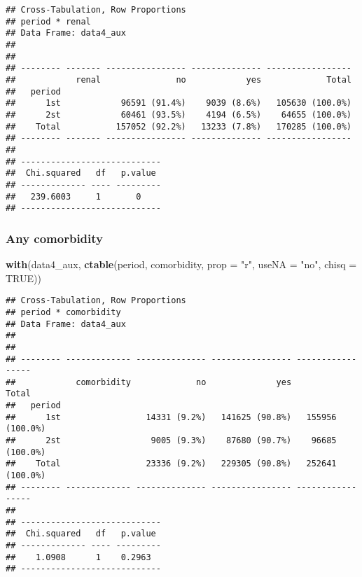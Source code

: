 \documentclass[
]{article}
\newenvironment{Shaded}{\begin{snugshade}}{\end{snugshade}}
\newcommand{\DataTypeTok}[1]{\textcolor[rgb]{0.13,0.29,0.53}{#1}}
\newcommand{\KeywordTok}[1]{\textcolor[rgb]{0.13,0.29,0.53}{\textbf{#1}}}
\newcommand{\NormalTok}[1]{#1}
\newcommand{\OtherTok}[1]{\textcolor[rgb]{0.56,0.35,0.01}{#1}}
\newcommand{\StringTok}[1]{\textcolor[rgb]{0.31,0.60,0.02}{#1}}
\begin{document}
\begin{verbatim}
## Cross-Tabulation, Row Proportions  
## period * renal  
## Data Frame: data4_aux  
## 
## 
## -------- ------- ---------------- -------------- -----------------
##            renal               no            yes             Total
##   period                                                          
##      1st            96591 (91.4%)    9039 (8.6%)   105630 (100.0%)
##      2st            60461 (93.5%)    4194 (6.5%)    64655 (100.0%)
##    Total           157052 (92.2%)   13233 (7.8%)   170285 (100.0%)
## -------- ------- ---------------- -------------- -----------------
## 
## ----------------------------
##  Chi.squared   df   p.value 
## ------------- ---- ---------
##   239.6003     1       0    
## ----------------------------
\end{verbatim}

\hypertarget{any-comorbidity}{%
\subsubsection{Any comorbidity}\label{any-comorbidity}}

\begin{Shaded}
\begin{Highlighting}[]
\KeywordTok{with}\NormalTok{(data4_aux, }\KeywordTok{ctable}\NormalTok{(period, comorbidity, }\DataTypeTok{prop =} \StringTok{"r"}\NormalTok{, }\DataTypeTok{useNA =} \StringTok{"no"}\NormalTok{, }\DataTypeTok{chisq =} \OtherTok{TRUE}\NormalTok{))}
\end{Highlighting}
\end{Shaded}

\begin{verbatim}
## Cross-Tabulation, Row Proportions  
## period * comorbidity  
## Data Frame: data4_aux  
## 
## 
## -------- ------------- -------------- ---------------- -----------------
##            comorbidity             no              yes             Total
##   period                                                                
##      1st                 14331 (9.2%)   141625 (90.8%)   155956 (100.0%)
##      2st                  9005 (9.3%)    87680 (90.7%)    96685 (100.0%)
##    Total                 23336 (9.2%)   229305 (90.8%)   252641 (100.0%)
## -------- ------------- -------------- ---------------- -----------------
## 
## ----------------------------
##  Chi.squared   df   p.value 
## ------------- ---- ---------
##    1.0908      1    0.2963  
## ----------------------------
\end{verbatim}
\end{document}
